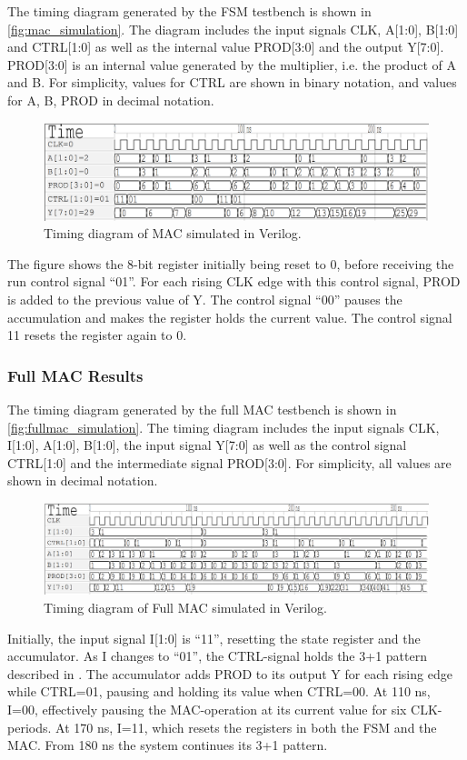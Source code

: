 The timing diagram generated by the FSM testbench is shown in \autoref{fig:mac_simulation}. The diagram includes the input signals CLK, A[1:0], B[1:0] and CTRL[1:0] as well as the internal value PROD[3:0] and the output Y[7:0]. PROD[3:0] is an internal value generated by the multiplier, i.e. the product of A and B. For simplicity,
values for CTRL are shown in binary notation, and values for A, B, PROD in decimal notation.

\begin{figure}[H]
    \centering
    \includegraphics[width=\textwidth]{Figures/Result MAC.png}
    \caption{Timing diagram of MAC simulated in Verilog.}
    \label{fig:mac_simulation}
\end{figure}

The figure shows the 8-bit register initially being reset to 0, before receiving the run control signal ``01''. For each rising CLK edge with this control signal, PROD is added to the previous value of Y. The control signal ``00'' pauses the accumulation and makes the register holds the current value. The control signal 11 resets the register again to 0. 

\subsubsection{Full MAC Results}

The timing diagram generated by the full MAC testbench is shown in \autoref{fig:fullmac_simulation}. The timing diagram includes the input signals CLK, I[1:0], A[1:0], B[1:0], the input signal Y[7:0] as well as the control signal CTRL[1:0] and the intermediate signal PROD[3:0]. For simplicity, all values are shown in decimal notation.

\begin{figure}[H]
    \centering
    \includegraphics[width=\textwidth]{Figures/Result full MAC3.png}
    \caption{Timing diagram of Full MAC simulated in Verilog.}
    \label{fig:fullmac_simulation}
\end{figure}

Initially, the input signal I[1:0] is ``11'', resetting the state register and the accumulator. As I changes to ``01'', the CTRL-signal holds the 3+1 pattern described in \cite[p.3]{project_description}. The accumulator adds PROD to its output Y for each rising edge while CTRL=01, pausing and holding its value when CTRL=00. At 110 ns, I=00, effectively pausing the MAC-operation at its current value for six CLK-periods. At 170 ns, I=11, which resets the registers in both the FSM and the MAC. From 180 ns the system continues its 3+1 pattern.
